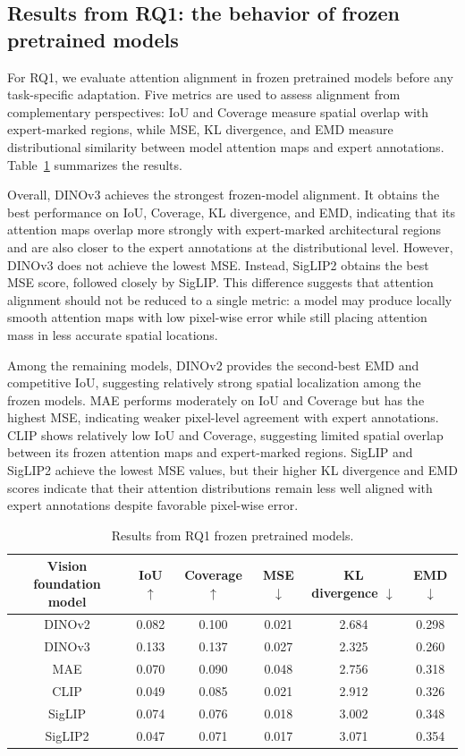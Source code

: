 \documentclass[lineno,pdflatex,sn-mathphys-num]{sn-jnl}%
\theoremstyle{thmstyleone}%
\theoremstyle{thmstyletwo}%
\theoremstyle{thmstylethree}%
\begin{document}
\subsection{Results from RQ1: the behavior of frozen pretrained models}

For RQ1, we evaluate attention alignment in frozen pretrained models before any task-specific adaptation. Five metrics are used to assess alignment from complementary perspectives: IoU and Coverage measure spatial overlap with expert-marked regions, while MSE, KL divergence, and EMD measure distributional similarity between model attention maps and expert annotations. Table~\ref{table RQ1 result} summarizes the results.

Overall, DINOv3 achieves the strongest frozen-model alignment. It obtains the best performance on IoU, Coverage, KL divergence, and EMD, indicating that its attention maps overlap more strongly with expert-marked architectural regions and are also closer to the expert annotations at the distributional level. However, DINOv3 does not achieve the lowest MSE. Instead, SigLIP2 obtains the best MSE score, followed closely by SigLIP. This difference suggests that attention alignment should not be reduced to a single metric: a model may produce locally smooth attention maps with low pixel-wise error while still placing attention mass in less accurate spatial locations.

Among the remaining models, DINOv2 provides the second-best EMD and competitive IoU, suggesting relatively strong spatial localization among the frozen models. MAE performs moderately on IoU and Coverage but has the highest MSE, indicating weaker pixel-level agreement with expert annotations. CLIP shows relatively low IoU and Coverage, suggesting limited spatial overlap between its frozen attention maps and expert-marked regions. SigLIP and SigLIP2 achieve the lowest MSE values, but their higher KL divergence and EMD scores indicate that their attention distributions remain less well aligned with expert annotations despite favorable pixel-wise error.

\begin{table}[!h]
\centering
\caption{Results from RQ1 frozen pretrained models.\label{table RQ1 result}}
\begin{tabular}{cccccc}
\toprule
Vision foundation model & IoU $\uparrow$ & Coverage $\uparrow$ & MSE $\downarrow$ & KL divergence $\downarrow$ & EMD $\downarrow$ \\ \midrule
DINOv2    & 0.082 & 0.100 & 0.021 & 2.684 & 0.298 \\
DINOv3     & 0.133 & 0.137 & 0.027 & 2.325 & 0.260 \\
MAE        & 0.070 & 0.090 & 0.048 & 2.756 & 0.318 \\
CLIP      & 0.049 & 0.085 & 0.021 & 2.912 & 0.326 \\
SigLIP    & 0.074 & 0.076 & 0.018 & 3.002 & 0.348 \\
SigLIP2   & 0.047 & 0.071 & 0.017 & 3.071 & 0.354 \\ \bottomrule
\end{tabular}
\end{table}
\end{document}
